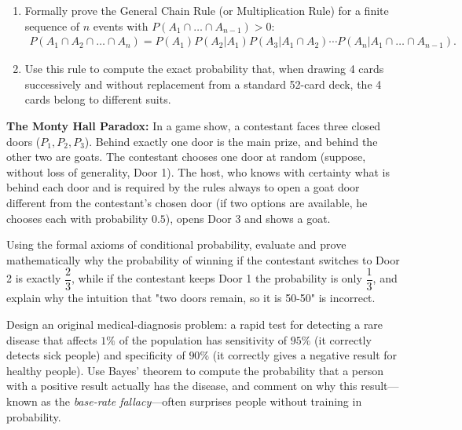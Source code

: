 \begin{problema}
	\label{prob:8a7282b}
	\begin{enumerate}
		\item Formally prove the General Chain Rule (or Multiplication Rule) for a finite sequence of $n$ events with $P(A_1 \cap \dots \cap A_{n-1}) > 0$:
		\begin{align}
			P(A_1 \cap A_2 \cap \dots \cap A_n) = P(A_1)P(A_2|A_1)P(A_3|A_1 \cap A_2) \cdots P(A_n|A_1 \cap \dots \cap A_{n-1}).
		\end{align}
		\item Use this rule to compute the exact probability that, when drawing 4 cards successively and without replacement from a standard 52-card deck, the 4 cards belong to different suits.
	\end{enumerate}
\end{problema}

\begin{problema}
	\label{prob:c840e8f}
	\textbf{The Monty Hall Paradox:} In a game show, a contestant faces three closed doors ($P_1, P_2, P_3$). Behind exactly one door is the main prize, and behind the other two are goats. The contestant chooses one door at random (suppose, without loss of generality, Door 1). The host, who knows with certainty what is behind each door and is required by the rules always to open a goat door different from the contestant's chosen door (if two options are available, he chooses each with probability $0.5$), opens Door 3 and shows a goat.

	Using the formal axioms of conditional probability, evaluate and prove mathematically why the probability of winning if the contestant switches to Door 2 is exactly $\dfrac{2}{3}$, while if the contestant keeps Door 1 the probability is only $\dfrac{1}{3}$, and explain why the intuition that "two doors remain, so it is 50-50" is incorrect.
\end{problema}

\begin{problema}
	\label{prob:4241cab}
	Design an original medical-diagnosis problem: a rapid test for detecting a rare disease that affects $1\%$ of the population has sensitivity of $95\%$ (it correctly detects sick people) and specificity of $90\%$ (it correctly gives a negative result for healthy people). Use Bayes' theorem to compute the probability that a person with a positive result actually has the disease, and comment on why this result---known as the \emph{base-rate fallacy}---often surprises people without training in probability.
\end{problema}

